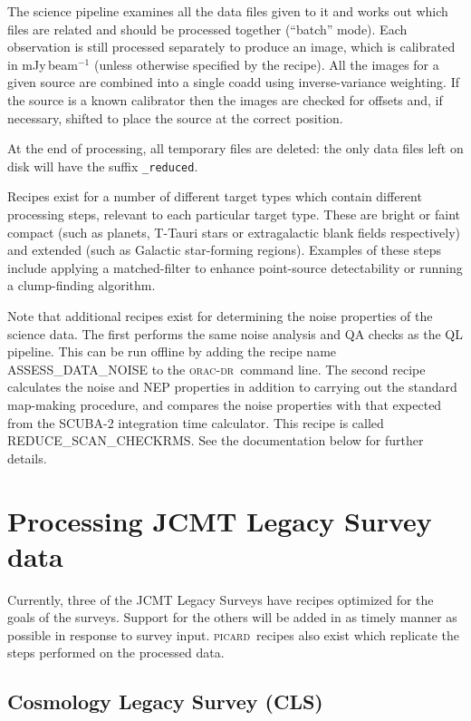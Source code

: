 \documentclass[twoside,11pt,nolof]{starlink}
\providecommand{\oracdr}{\textsc{orac-dr}}
\providecommand{\picard}{\textsc{picard}}
\begin{document}
The science pipeline examines all the data files given to it and works
out which files are related and should be processed together
(``batch'' mode). Each observation is still processed separately to
produce an image, which is calibrated in mJy\,beam$^{-1}$ (unless
otherwise specified by the recipe). All the images for a given source
are combined into a single coadd using inverse-variance weighting. If
the source is a known calibrator then the images are checked for
offsets and, if necessary, shifted to place the source at the correct
position.

At the end of processing, all temporary files are deleted: the only
data files left on disk will have the suffix \verb+_reduced+.

Recipes exist for a number of different target types which contain
different processing steps, relevant to each particular target
type. These are bright or faint compact (such as planets, T-Tauri
stars or extragalactic blank fields respectively) and extended (such
as Galactic star-forming regions). Examples of these steps include
applying a matched-filter to enhance point-source detectability or
running a clump-finding algorithm.

Note that additional recipes exist for determining the noise
properties of the science data. The first performs the same noise
analysis and QA checks as the QL pipeline. This can be run offline by
adding the recipe name ASSESS\_DATA\_NOISE to the \oracdr\ command
line. The second recipe calculates the noise and NEP properties in
addition to carrying out the standard map-making procedure, and
compares the noise properties with that expected from the SCUBA-2
integration time calculator. This recipe is called
REDUCE\_SCAN\_CHECKRMS. See the documentation below for further
details.

\section{Processing JCMT Legacy Survey data\label{se:jlsrec}}

Currently, three of the JCMT Legacy Surveys have recipes optimized for
the goals of the surveys. Support for the others will be added in as
timely manner as possible in response to survey
input. \picard\ recipes also exist which replicate the steps performed
on the processed data.

\subsection{Cosmology Legacy Survey (CLS)}
\end{document}
